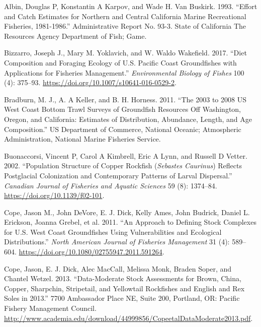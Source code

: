 \documentclass[11pt,
  english,
  letterpaper,
]{article}
\newlength{\cslhangindent}
\newenvironment{CSLReferences}[2] %
 {%
  \setlength{\parindent}{0pt}
  \ifodd #1 \everypar{\setlength{\hangindent}{\cslhangindent}}\ignorespaces\fi
  \ifnum #2 > 0
  \setlength{\parskip}{#2\baselineskip}
  \fi
 }%
 {}
\begin{document}
\hypertarget{refs}{}
\begin{CSLReferences}{1}{0}
\leavevmode{}%
Albin, Douglas P, Konstantin A Karpov, and Wade H. Van Buskirk. 1993. {``Effort and Catch Estimates for {Northern} and {Central} {California} Marine Recreational Fisheries, 1981-1986.''} Administrative Report No. 93-3. State of California The Resources Agency Department of Fish; Game.

\leavevmode{}%
Bizzarro, Joseph J., Mary M. Yoklavich, and W. Waldo Wakefield. 2017. {``Diet Composition and Foraging Ecology of {U}.{S}. {Pacific} {Coast} Groundfishes with Applications for Fisheries Management.''} \emph{Environmental Biology of Fishes} 100 (4): 375--93. \url{https://doi.org/10.1007/s10641-016-0529-2}.

\leavevmode{}%
Bradburn, M. J., A. A Keller, and B. H. Horness. 2011. {``The 2003 to 2008 {US} {West} {Coast} Bottom Trawl Surveys of Groundfish Resources Off {Washington}, {Oregon}, and {California}: Estimates of Distribution, Abundance, Length, and Age Composition.''} US Department of Commerce, National Oceanic; Atmospheric Administration, National Marine Fisheries Service.

\leavevmode{}%
Buonaccorsi, Vincent P, Carol A Kimbrell, Eric A Lynn, and Russell D Vetter. 2002. {``Population Structure of Copper Rockfish (\emph{{Sebastes} Caurinus}) Reflects Postglacial Colonization and Contemporary Patterns of Larval Dispersal.''} \emph{Canadian Journal of Fisheries and Aquatic Sciences} 59 (8): 1374--84. \url{https://doi.org/10.1139/f02-101}.

\leavevmode{}%
Cope, Jason M., John DeVore, E. J. Dick, Kelly Ames, John Budrick, Daniel L. Erickson, Joanna Grebel, et al. 2011. {``An {Approach} to {Defining} {Stock} {Complexes} for {U}.{S}. {West} {Coast} {Groundfishes} {Using} {Vulnerabilities} and {Ecological} {Distributions}.''} \emph{North American Journal of Fisheries Management} 31 (4): 589--604. \url{https://doi.org/10.1080/02755947.2011.591264}.

\leavevmode{}%
Cope, Jason, E. J. Dick, Alec MacCall, Melissa Monk, Braden Soper, and Chantel Wetzel. 2013. {``Data-Moderate Stock Assessments for Brown, {China}, Copper, Sharpchin, Stripetail, and Yellowtail Rockfishes and {English} and Rex Soles in 2013.''} 7700 Ambassador Place NE, Suite 200, Portland, OR: Pacific Fishery Management Council. \url{http://www.academia.edu/download/44999856/CopeetalDataModerate2013.pdf}.


\end{CSLReferences}
\end{document}
